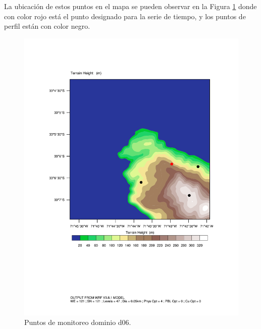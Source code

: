 La ubicación de estos puntos en el mapa se pueden observar en la Figura \ref{fig:monitor} donde con color rojo está el punto designado para la serie de tiempo, y los puntos de perfil están con color negro.
\begin{figure}[H]
	\centering
	\includegraphics[width=0.85\linewidth,trim={1cm 7cm -1cm 4cm},clip]{Imagenes/altura}
	\caption{Puntos de monitoreo dominio d06.}
	\label{fig:monitor}
\end{figure}